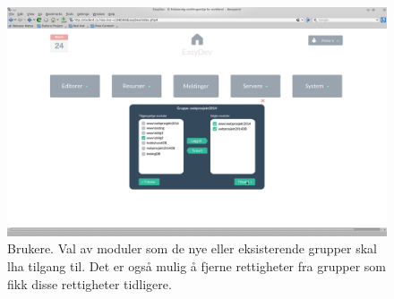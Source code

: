 \begin{figure}[ht]
\includegraphics[width=\textwidth,height=\textheight,keepaspectratio]{./img/prosessdokumentasjon/hifi/b4.png}
\caption[Hi-fi Brukere 4]{Brukere. Val av moduler som de nye eller eksisterende grupper skal lha tilgang til. Det er også mulig å fjerne rettigheter fra grupper som fikk disse rettigheter tidligere.}
\label{fig:brukerehi4}
\end{figure}